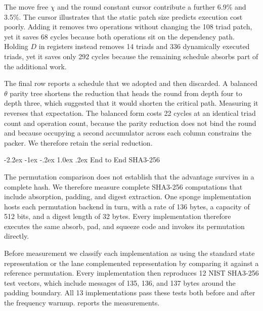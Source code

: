 \documentclass[journal=tches,submission]{iacrtrans}
\makeatletter
\renewcommand\subsection{\@startsection{subsection}{2}{\z@}%
      {-2.2ex \@plus -1ex \@minus -.2ex}%
      {1.0ex \@plus .2ex}%
      {\normalfont\large\bfseries\SS@subsectfont}}
\makeatother
\begin{document}
The move free $\chi$ and the round constant cursor contribute a further 6.9\% and 3.5\%.
The cursor illustrates that the static patch size predicts execution cost poorly.
Adding it removes two operations without changing the 108 triad patch, yet it saves 68 cycles because both operations sit on the dependency path.
Holding $D$ in registers instead removes 14 triads and 336 dynamically executed triads, yet it saves only 292 cycles because the remaining schedule absorbs part of the additional work.

The final row reports a schedule that we adopted and then discarded.
A balanced $\theta$ parity tree shortens the reduction that heads the round from depth four to depth three, which suggested that it would shorten the critical path.
Measuring it reverses that expectation.
The balanced form costs 22 cycles at an identical triad count and operation count, because the parity reduction does not bind the round and because occupying a second accumulator across each column constrains the packer.
We therefore retain the serial reduction.

\subsection{End to End SHA3-256}
\label{sec:keccak-sha3}

The permutation comparison does not establish that the advantage survives in a complete hash.
We therefore measure complete SHA3-256 computations that include absorption, padding, and digest extraction.
One sponge implementation hosts each permutation backend in turn, with a rate of 136 bytes, a capacity of 512 bits, and a digest length of 32 bytes.
Every implementation therefore executes the same absorb, pad, and squeeze code and invokes its permutation directly.

Before measurement we classify each implementation as using the standard state representation or the lane complemented representation by comparing it against a reference permutation.
Every implementation then reproduces 12 NIST SHA3-256 test vectors, which include messages of 135, 136, and 137 bytes around the padding boundary.
All 13 implementations pass these tests both before and after the frequency warmup.
 reports the measurements.
\end{document}
